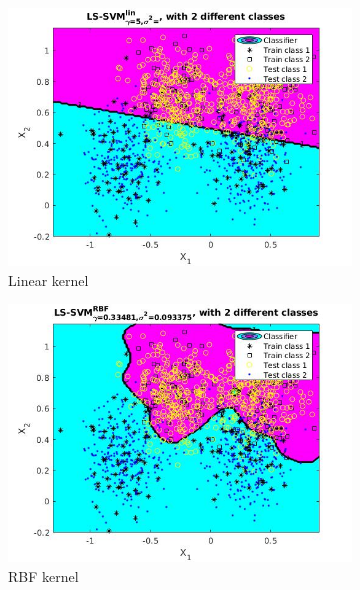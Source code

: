\documentclass{article}
\begin{document}
\begin{figure}[]
        \begin{subfigure}{0.45\linewidth}
            \includegraphics[width=\linewidth]{ripley_linear}
            \caption{Linear kernel}
        \end{subfigure}
        \begin{subfigure}{0.45\linewidth}
            \includegraphics[width=\linewidth]{ripley_rbf}
            \caption{RBF kernel}
        \end{subfigure}
        \centering
	   \begin{subfigure}{0.45\linewidth}

\end{subfigure}
\end{figure}
\end{document}
